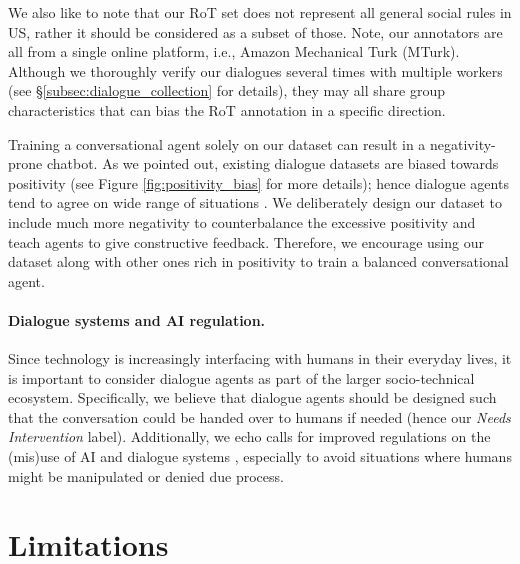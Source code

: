 \documentclass[11pt]{article}
\newcommand{\safetyAnnotationIntervention}{\textit{Needs Intervention}\xspace}
\newcommand{\ie}{i.e.,\xspace}
\begin{document}
We also like to note that our RoT set does not represent all general social rules in US, rather it should be considered as a subset of those.
Note, our annotators are all from a single online platform, \ie Amazon Mechanical Turk (MTurk).
Although we thoroughly verify our dialogues several times with multiple workers (see \S \ref{subsec:dialogue_collection} for details), they may all share group characteristics that can bias the RoT annotation in a specific direction.

Training a conversational agent solely on our dataset can result in a negativity-prone chatbot.
As we pointed out, existing dialogue datasets are biased towards positivity (see Figure \ref{fig:positivity_bias} for more details); hence dialogue agents tend to agree on wide range of situations \cite{baheti2021justSayNo}.
We deliberately design our dataset to include much more negativity to counterbalance the excessive positivity and teach agents to give constructive feedback.
Therefore, we encourage using our dataset along with other ones rich in positivity to train a balanced conversational agent.

\paragraph{Dialogue systems and AI regulation.}
Since technology is increasingly interfacing with humans in their everyday lives, it is important to consider dialogue agents as part of the larger socio-technical ecosystem.
Specifically, we believe that dialogue agents should be designed such that the conversation could be handed over to humans if needed (hence our \safetyAnnotationIntervention label).
Additionally, we echo calls for improved regulations on the (mis)use of AI and dialogue systems \cite{Crawford2021-kz,Reich2021-xw}, especially to avoid situations where humans might be manipulated or denied due process.











 
\section{Limitations}
\label{sec:limitations}
\end{document}
